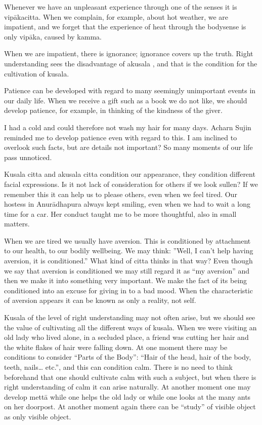 Whenever we have an unpleasant experience through one of the senses it
is vipākacitta. When we complain, for example, about hot weather, we are
impatient, and we forget that the experience of heat through the
bodysense is only vipāka, caused by kamma.

When we are impatient, there is ignorance; ignorance covers up the
truth. Right understanding sees the disadvantage of akusala , and that
is the condition for the cultivation of kusala.

Patience can be developed with regard to many seemingly unimportant
events in our daily life. When we receive a gift such as a book we do
not like, we should develop patience, for example, in thinking of the
kindness of the giver.

I had a cold and could therefore not wash my hair for many days. Acharn
Sujin reminded me to develop patience even with regard to this. I am
inclined to overlook such facts, but are details not important? So many
moments of our life pass unnoticed.

Kusala citta and akusala citta condition our appearance, they condition
different facial expressions. Is it not lack of consideration for others
if we look sullen? If we remember this it can help us to please others,
even when we feel tired. Our hostess in Anurādhapura always kept
smiling, even when we had to wait a long time for a car. Her conduct
taught me to be more thoughtful, also in small matters.

When we are tired we usually have aversion. This is conditioned by
attachment to our health, to our bodily wellbeing. We may think: ''Well,
I can't help having aversion, it is conditioned.'' What kind of citta
thinks in that way? Even though we say that aversion is conditioned we
may still regard it as ``my aversion'' and then we make it into
something very important. We make the fact of its being conditioned into
an excuse for giving in to a bad mood. When the characteristic of
aversion appears it can be known as only a reality, not self.

Kusala of the level of right understanding may not often arise, but we
should see the value of cultivating all the different ways of kusala.
When we were visiting an old lady who lived alone, in a secluded place,
a friend was cutting her hair and the white flakes of hair were falling
down. At one moment there may be conditions to consider ``Parts of the
Body'': ``Hair of the head, hair of the body, teeth, nails\ldots{}
etc.'', and this can condition calm. There is no need to think
beforehand that one should cultivate calm with such a subject, but when
there is right understanding of calm it can arise naturally. At another
moment one may develop mettā while one helps the old lady or while one
looks at the many ants on her doorpost. At another moment again there
can be ``study'' of visible object as only visible object.

